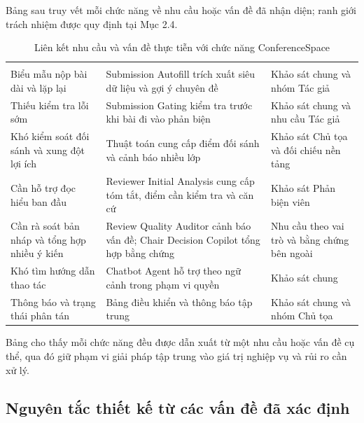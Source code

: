 Bảng sau truy vết mỗi chức năng về nhu cầu hoặc vấn đề đã nhận diện; ranh giới trách nhiệm được quy định tại Mục 2.4.

\begingroup
\setlength{\tabcolsep}{2pt}
\setlength{\LTleft}{0pt plus \textwidth}
\setlength{\LTright}{0pt plus \textwidth}
\begin{longtable}{|P{0.31\textwidth}|P{0.31\textwidth}|P{0.31\textwidth}|}
  \caption{Liên kết nhu cầu và vấn đề thực tiễn với chức năng ConferenceSpace}\\
\hline
{} &  &  \\ \hline
\endfirsthead
\hline
{} &  &  \\ \hline
\endhead
\hline
\endfoot
Biểu mẫu nộp bài dài và lặp lại & Submission Autofill trích xuất siêu dữ liệu và gợi ý chuyên đề & Khảo sát chung và nhóm Tác giả \\ \hline
Thiếu kiểm tra lỗi sớm & Submission Gating kiểm tra trước khi bài đi vào phản biện & Khảo sát chung và nhu cầu Tác giả \\ \hline
Khó kiểm soát đối sánh và xung đột lợi ích & Thuật toán cung cấp điểm đối sánh và cảnh báo nhiều lớp & Khảo sát Chủ tọa và đối chiếu nền tảng \\ \hline
Cần hỗ trợ đọc hiểu ban đầu & Reviewer Initial Analysis cung cấp tóm tắt, điểm cần kiểm tra và căn cứ & Khảo sát Phản biện viên \\ \hline
Cần rà soát bản nháp và tổng hợp nhiều ý kiến & Review Quality Auditor cảnh báo vấn đề; Chair Decision Copilot tổng hợp bằng chứng & Nhu cầu theo vai trò và bằng chứng bên ngoài \\ \hline
Khó tìm hướng dẫn thao tác & Chatbot Agent hỗ trợ theo ngữ cảnh trong phạm vi quyền & Khảo sát chung \\ \hline
Thông báo và trạng thái phân tán & Bảng điều khiển và thông báo tập trung & Khảo sát chung và nhóm Chủ tọa \\ \hline
\end{longtable}
\endgroup

Bảng cho thấy mỗi chức năng đều được dẫn xuất từ một nhu cầu hoặc vấn đề cụ thể, qua đó giữ phạm vi giải pháp tập trung vào giá trị nghiệp vụ và rủi ro cần xử lý.

\subsection{Nguyên tắc thiết kế từ các vấn đề đã xác định}

